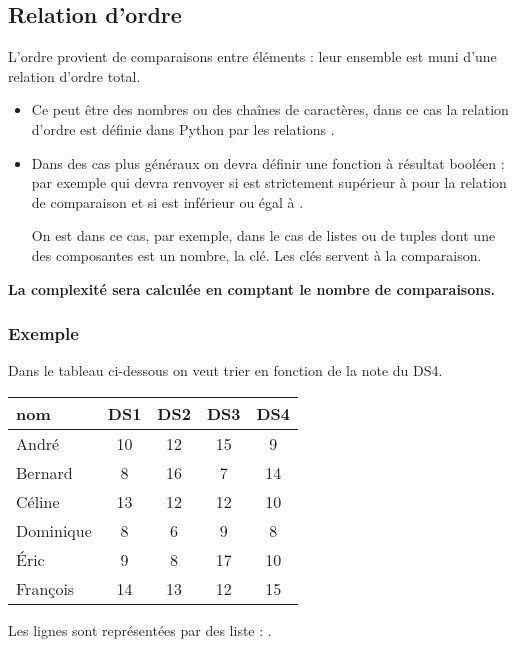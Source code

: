 \subsection{Relation d'ordre}
L'ordre provient de comparaisons entre éléments : leur ensemble est muni d'une relation d'ordre total. 

\begin{itemize}
  \item Ce peut être des nombres ou des chaînes de caractères, dans ce cas la relation d'ordre est définie dans Python par les relations \type{<, <=, >, >=}.
  \item Dans des cas plus généraux on devra définir une fonction à résultat booléen : par exemple  qui devra renvoyer  si  est strictement supérieur à  pour la relation de comparaison et  si  est inférieur ou égal à .
  
  On est dans ce cas, par exemple, dans le cas de listes ou de tuples dont une des composantes est un nombre, la clé. Les clés servent à la comparaison.
\end{itemize}

\medskip

{\bf La complexité sera calculée en comptant le nombre de comparaisons.}
\subsubsection{Exemple}
 Dans le tableau ci-dessous on veut trier en fonction de la note du DS4.
\begin{center}
\begin{tabular}{l|cccc}
nom       & DS1 & DS2 & DS3 & DS4 \\
\hline
André     & 10 & 12 & 15 &  9 \\ 
Bernard   &  8 & 16 &  7 & 14 \\ 
Céline    & 13 & 12 & 12 & 10 \\ 
Dominique &  8 &  6 &  9 &  8 \\ 
Éric      &  9 &  8 & 17 & 10 \\ 
François  & 14 & 13 & 12 & 15 \\ 
\end{tabular}
\end{center}
Les lignes sont représentées par des liste : \type{["André", 10, 12, 15, 9]}. 

